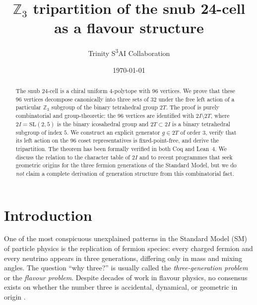 \documentclass[10pt,reqno]{amsart}
\title[$\mathbb{Z}_3$ tripartition of the snub 24-cell]{%
  $\mathbb{Z}_3$ tripartition of the snub 24-cell as a flavour structure}
\author{Trinity S\textsuperscript{3}AI Collaboration}
\date{\today}
\theoremstyle{plain}
\theoremstyle{definition}
\begin{document}
\begin{abstract}
The snub 24-cell is a chiral uniform 4-polytope with 96 vertices. We prove that these 96 vertices decompose canonically into three sets of 32 under the free left action of a particular $\mathbb{Z}_3$ subgroup of the binary tetrahedral group $2T$. The proof is purely combinatorial and group-theoretic: the 96 vertices are identified with $2I \setminus 2T$, where $2I = \mathrm{SL}(2,5)$ is the binary icosahedral group and $2T \subset 2I$ is a binary tetrahedral subgroup of index $5$. We construct an explicit generator $g \in 2T$ of order $3$, verify that its left action on the 96 coset representatives is fixed-point-free, and derive the tripartition. The theorem has been formally verified in both Coq and Lean~4. We discuss the relation to the character table of $2I$ and to recent programmes that seek geometric origins for the three fermion generations of the Standard Model, but we do \emph{not} claim a complete derivation of generation structure from this combinatorial fact.
\end{abstract}

\maketitle

\section{Introduction}\label{sec:intro}

One of the most conspicuous unexplained patterns in the Standard Model (SM) of particle physics is the replication of fermion species: every charged fermion and every neutrino appears in three generations, differing only in mass and mixing angles. The question ``why three?'' is usually called the \emph{three-generation problem} or the \emph{flavour problem}. Despite decades of work in flavour physics, no consensus exists on whether the number three is accidental, dynamical, or geometric in origin \cite{FroggattNielsen1991,PetcovTitov2025}.
\end{document}
